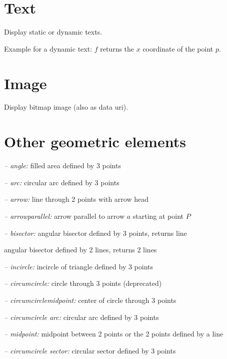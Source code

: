 \section{Text}
Display static or dynamic texts.\par
{}
Example for a dynamic text: $f$ returns the $x$ coordinate of the point $p$.\par

\section{Image}
Display bitmap image (also as data uri).\par
{}

\section{Other geometric elements}
{\sl -- angle:} \hfill filled area defined by 3 points
\par{\sl -- arc:} \hfill circular arc defined by 3 points
\par{\sl -- arrow:} \hfill line through 2 points with arrow head
\par{\sl -- arrowparallel:} \hfill arrow parallel to arrow $a$ starting at point $P$
\par{\sl -- bisector:} \hfill angular bisector defined by 3 points, returns line
\par{} \hfill angular bisector defined by 2 lines, returns 2 lines
\par{\sl -- incircle:} \hfill incircle of triangle defined by 3 points
\par{\sl -- circumcircle:} \hfill circle through 3 points (deprecated)
\par{\sl -- circumcirclemidpoint:} \hfill center of circle through 3 points
\par{\sl -- circumcircle arc:} \hfill circular arc defined by 3 points
\par{\sl -- midpoint:} midpoint between 2 points or the 2 points defined by a line
\par{\sl -- circumcircle sector:} \hfill circular sector defined by 3 points


